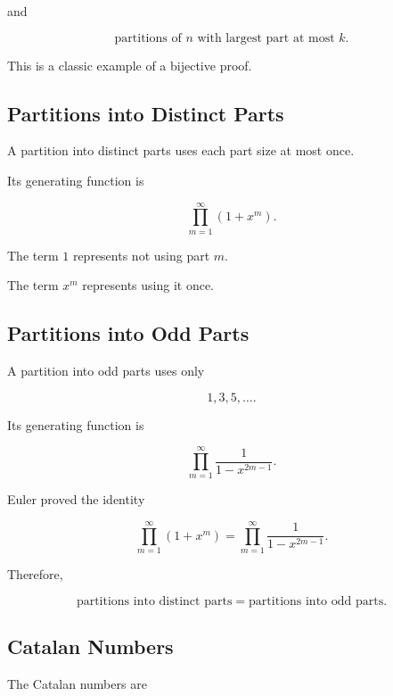 and

\[
\boxed{
\text{partitions of }n\text{ with largest part at most }k.
}
\]

This is a classic example of a bijective proof.

\subsection{Partitions into Distinct Parts}
\label{subsec:enumerative-distinct-partitions}

A partition into distinct parts uses each part size at most once.

Its generating function is

\[
\boxed{
\prod_{m=1}^{\infty}(1+x^m).
}
\]

The term \(1\) represents not using part \(m\).

The term \(x^m\) represents using it once.

\subsection{Partitions into Odd Parts}
\label{subsec:enumerative-odd-partitions}

A partition into odd parts uses only

\[
1,3,5,\ldots.
\]

Its generating function is

\[
\boxed{
\prod_{m=1}^{\infty}
\frac{1}{1-x^{2m-1}}.
}
\]

Euler proved the identity

\[
\boxed{
\prod_{m=1}^{\infty}(1+x^m)
=
\prod_{m=1}^{\infty}
\frac{1}{1-x^{2m-1}}.
}
\]

Therefore,

\[
\boxed{
\text{partitions into distinct parts}
=
\text{partitions into odd parts}.
}
\]

\subsection{Catalan Numbers}
\label{subsec:catalan-numbers-enumerative}

The Catalan numbers are

